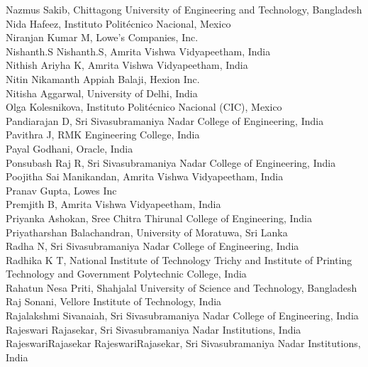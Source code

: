 \documentclass[11pt,oneside]{book}
\begin{document}
\begin{description}
          Nazmus Sakib, Chittagong University of Engineering and Technology, Bangladesh\\
          Nida Hafeez, Instituto Politécnico Nacional, Mexico\\
          Niranjan Kumar M, Lowe's Companies, Inc.\\
          Nishanth.S Nishanth.S, Amrita Vishwa Vidyapeetham, India\\
          Nithish Ariyha K, Amrita Vishwa Vidyapeetham, India\\
          Nitin Nikamanth Appiah Balaji, Hexion Inc.\\
          Nitisha Aggarwal, University of Delhi, India\\
          Olga Kolesnikova, Instituto Politécnico Nacional (CIC), Mexico\\
          Pandiarajan D, Sri Sivasubramaniya Nadar College of Engineering, India\\
          Pavithra J, RMK Engineering College, India\\
          Payal Godhani, Oracle, India\\
          Ponsubash Raj R, Sri Sivasubramaniya Nadar College of Engineering, India\\
          Poojitha Sai Manikandan, Amrita Vishwa Vidyapeetham, India\\
          Pranav Gupta, Lowes Inc\\
          Premjith B, Amrita Vishwa Vidyapeetham, India\\
          Priyanka Ashokan, Sree Chitra Thirunal College of Engineering, India\\
          Priyatharshan Balachandran, University of Moratuwa, Sri Lanka\\
          Radha N, Sri Sivasubramaniya Nadar College of Engineering, India\\
          Radhika K T, National Institute of Technology Trichy and Institute of Printing Technology and Government Polytechnic College, India\\
          Rahatun Nesa Priti, Shahjalal University of Science and Technology, Bangladesh\\
          Raj Sonani, Vellore Institute of Technology, India\\
          Rajalakshmi Sivanaiah, Sri Sivasubramaniya Nadar College of Engineering, India\\
          Rajeswari Rajasekar, Sri Sivasubramaniya Nadar Institutions, India\\
          RajeswariRajasekar RajeswariRajasekar, Sri Sivasubramaniya Nadar Institutions, India\\

\end{description}
\end{document}
